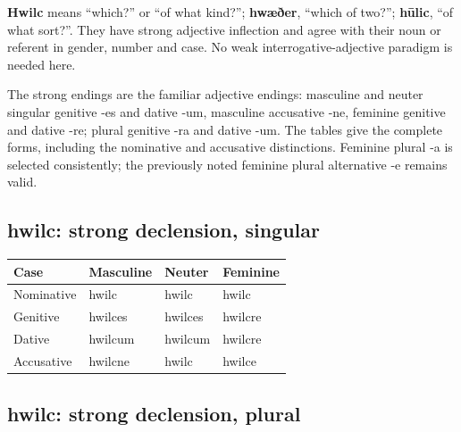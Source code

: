 \textbf{Hwilc} means “which?” or “of what kind?”; \textbf{hwæðer}, “which of two?”; \textbf{hūlic}, “of what sort?”. They have strong adjective inflection and agree with their noun or referent in gender, number and case. No weak interrogative-adjective paradigm is needed here.

The strong endings are the familiar adjective endings: masculine and neuter singular genitive -es and dative -um, masculine accusative -ne, feminine genitive and dative -re; plural genitive -ra and dative -um. The tables give the complete forms, including the nominative and accusative distinctions. Feminine plural -a is selected consistently; the previously noted feminine plural alternative -e remains valid.

\subsection*{hwilc: strong declension, singular}

\par\begingroup
\fontsize{10.5}{13.2}\selectfont
\setlength{\LTleft}{0pt}\setlength{\LTright}{\fill}
\noindent
\begin{tabular}{@{}>{\raggedright\arraybackslash}p{28.89mm}>{\raggedright\arraybackslash}p{28.89mm}>{\raggedright\arraybackslash}p{28.89mm}>{\raggedright\arraybackslash}p{28.89mm}@{}}
\toprule
\textbf{Case} & \textbf{Masculine} & \textbf{Neuter} & \textbf{Feminine} \\
\midrule
Nominative & hwilc & hwilc & hwilc \\
Genitive & hwilces & hwilces & hwilcre \\
Dative & hwilcum & hwilcum & hwilcre \\
Accusative & hwilcne & hwilc & hwilce \\
\bottomrule
\end{tabular}
\par\endgroup

\subsection*{hwilc: strong declension, plural}

